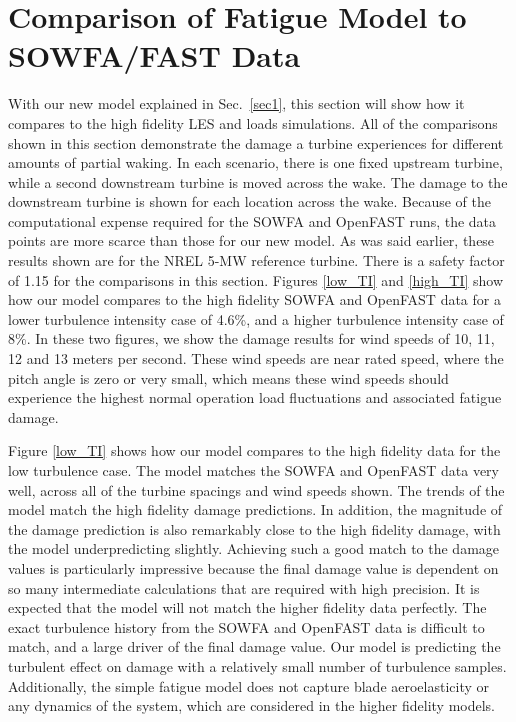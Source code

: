 \documentclass[11pt,letterpaper]{article}
\begin{document}
\section{Comparison of Fatigue Model to SOWFA/FAST Data}
With our new model explained in Sec.~\ref{sec1}, this section will show how it compares to the high fidelity LES and loads simulations. All of the comparisons shown in this section demonstrate the damage a turbine experiences for different amounts of partial waking. In each scenario, there is one fixed upstream turbine, while a second downstream turbine is moved across the wake. The damage to the downstream turbine is shown for each location across the wake. Because of the computational expense required for the SOWFA and OpenFAST runs, the data points are more scarce than those for our new model. As was said earlier, these results shown are for the NREL 5-MW reference turbine. There is a safety factor of 1.15 for the comparisons in this section. Figures \ref{low_TI} and \ref{high_TI} show how our model compares to the high fidelity SOWFA and OpenFAST data for a lower turbulence intensity case of 4.6\%, and a higher turbulence intensity case of 8\%. In these two figures, we show the damage results for wind speeds of 10, 11, 12 and 13 meters per second. These wind speeds are near rated speed, where the pitch angle is zero or very small, which means these wind speeds should experience the highest normal operation load fluctuations and associated fatigue damage.

Figure \ref{low_TI} shows how our model compares to the high fidelity data for the low turbulence case. The model matches the SOWFA and OpenFAST data very well, across all of the turbine spacings and wind speeds shown. The trends of the model match the high fidelity damage predictions. In addition, the magnitude of the damage prediction is also remarkably close to the high fidelity damage, with the model underpredicting slightly. Achieving such a good match to the damage values is particularly impressive because the final damage value is dependent on so many intermediate calculations that are required with high precision. It is expected that the model will not match the higher fidelity data perfectly. The exact turbulence history from the SOWFA and OpenFAST data is difficult to match, and a large driver of the final damage value. Our model is predicting the turbulent effect on damage with a relatively small number of turbulence samples. Additionally, the simple fatigue model does not capture blade aeroelasticity or any dynamics of the system, which are considered in the higher fidelity models.
\end{document}
